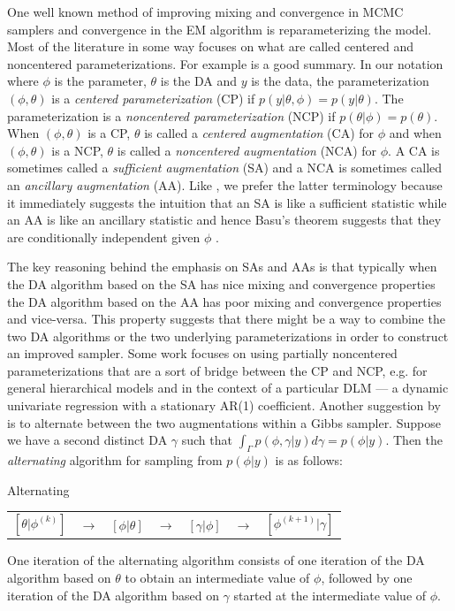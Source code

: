 \documentclass{article}
\begin{document}
One well known method of improving mixing and convergence in MCMC samplers and convergence in the EM algorithm is reparameterizing the model. Most of the literature in some way focuses on what are called centered and noncentered parameterizations. For example  is a good summary. In our notation where $\phi$ is the parameter, $\theta$ is the DA and $y$ is the data, the parameterization $(\phi,\theta)$ is a {\it centered parameterization} (CP) if $p(y|\theta,\phi)=p(y|\theta)$. The parameterization is a {\it noncentered parameterization} (NCP) if $p(\theta|\phi)=p(\theta)$. When $(\phi,\theta)$ is a CP, $\theta$ is called a {\it centered augmentation} (CA) for $\phi$ and when $(\phi,\theta)$ is a NCP, $\theta$ is called a {\it noncentered augmentation} (NCA) for $\phi$. A CA is sometimes called a {\it sufficient augmentation} (SA) and a NCA is sometimes called an {\it ancillary augmentation} (AA)\cite{yu2011center}. Like , we prefer the latter terminology because it immediately suggests the intuition that an SA is like a sufficient statistic while an AA is like an ancillary statistic and hence Basu's theorem suggests that they are conditionally independent given $\phi$ \cite{basu1955statistics}. 

The key reasoning behind the emphasis on SAs and AAs is that typically when the DA algorithm based on the SA has nice mixing and convergence properties the DA algorithm based on the AA has poor mixing and convergence properties and vice-versa. This property suggests that there might be a way to combine the two DA algorithms or the two underlying parameterizations in order to construct an improved sampler. Some work focuses on using partially noncentered parameterizations that are a sort of bridge between the CP and NCP, e.g.  for general hierarchical models and  in the context of a particular DLM --- a dynamic univariate regression with a stationary AR(1) coefficient. Another suggestion by  is to alternate between the two augmentations within a Gibbs sampler. Suppose we have a second distinct DA $\gamma$ such that $\int_\Gamma p(\phi,\gamma|y)d\gamma = p(\phi|y)$. Then the {\it alternating} algorithm for sampling from $p(\phi|y)$ is as follows:
\begin{alg*}[Alt]Alternating\label{alg:Alt} \\
  \begin{center}
    \begin{tabular}{lllllll}
  $[\theta|\phi^{(k)}]$& $\to$& $[\phi|\theta]$& $\to$& $[\gamma|\phi]$& $\to$& $[\phi^{(k+1)}|\gamma]$
    \end{tabular}
  \end{center}
\end{alg*}
\noindent One iteration of the alternating algorithm consists of one iteration of the DA algorithm based on $\theta$ to obtain an intermediate value of $\phi$, followed by one iteration of the DA algorithm based on $\gamma$ started at the intermediate value of $\phi$. 
\end{document}
